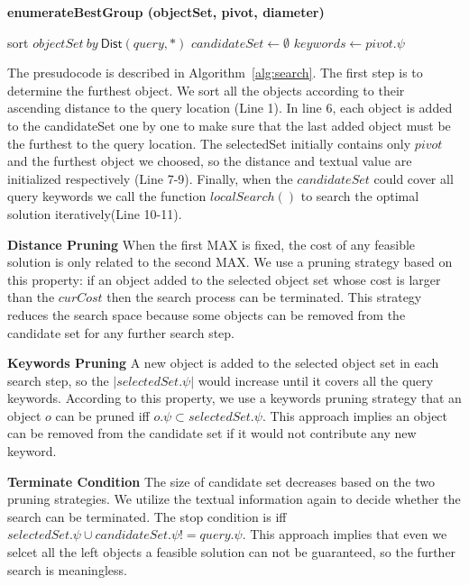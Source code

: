 \documentclass{sig-alternate}
\begin{document}
\begin{algorithm}[!ht]\small\label{alg:search}
\caption{ \bf {enumerateBestGroup} (objectSet, pivot, diameter)}

sort $objectSet\ by\ \textsf{Dist}(query,*)$\;
$candidateSet\gets \emptyset$\;
$keywords\gets pivot.\psi$\;


\end{algorithm}
The presudocode is described in Algorithm~\ref{alg:search}.
The first step is to determine the furthest object. We sort all the objects
according to their ascending distance to the query location (Line 1).
In line 6, each object is added to the candidateSet one by one to make sure that
the last added object must be the furthest to the query location.
The selectedSet initially contains only $pivot$ and the furthest object we choosed,
so the distance and textual value are initialized respectively (Line 7-9).
Finally, when the $candidateSet$ could cover all query keywords
we call the function $localSearch()$ to search the optimal solution
iteratively(Line 10-11).

\textbf{Distance Pruning} When the first \textsf{MAX} is fixed, the cost of any
feasible solution is only related to the second \textsf{MAX}. We use a pruning strategy
based on this property: if an object added to the selected object set whose cost
is larger than the $curCost$ then the search process can be terminated. This strategy
reduces the search space because some objects can be removed from the candidate set for
any further search step.

\textbf{Keywords Pruning} A new object is added to the selected object set in each search
step, so the $|selectedSet.\psi|$ would increase until it covers all the query keywords.
According to this property, we use a keywords pruning strategy that an object $o$ can be pruned
iff $o.\psi \subset selectedSet.\psi$. This approach implies an object can be removed from
the candidate set if it would not contribute any new keyword.

\textbf{Terminate Condition} The size of candidate set decreases based on the two pruning strategies. 
We utilize the textual information again to decide whether the search can be terminated. The stop condition
is iff $selectedSet.\psi \cup candidateSet.\psi != query.\psi$. This approach implies that even
we selcet all the left objects a feasible solution can not be guaranteed, so the further search is meaningless.
\end{document}
